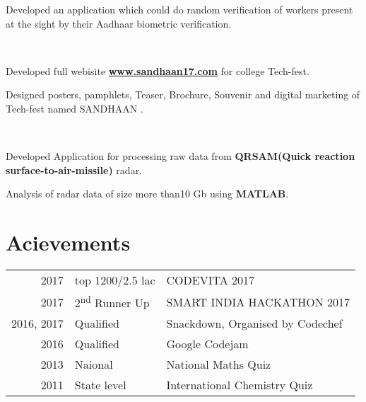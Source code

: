 \documentclass[a4paper]{deedy-resume} %
\begin{document}
\begin{minipage}[t]{0.66\textwidth}
\begin{tightitemize}
\item Developed an application which could do random verification of workers present at the sight by their Aadhaar biometric verification.

\end{tightitemize}
\sectionspace
{}\\

\begin{tightitemize}
\item Developed full webisite \href{http://www.sandhaan17.com} {\bf www.sandhaan17.com}  for college Tech-fest.
\item Designed posters, pamphlets, Teaser, Brochure, Souvenir and digital marketing of Tech-fest named SANDHAAN .
\end{tightitemize}
\sectionspace
 \\

\begin{tightitemize}
\item Developed Application for processing  raw data from \textbf{ QRSAM(Quick reaction surface-to-air-missile)} radar.
\item Analysis of radar data of size more than10 Gb using \textbf{MATLAB}.
\end{tightitemize}


\sectionspace %


\section{Acievements} 

\begin{tabular}{rll}
2017	 & top 1200/2.5 lac & CODEVITA 2017 \\
2017	 & 2\textsuperscript{nd} Runner Up &  SMART INDIA HACKATHON 2017\\
2016, 2017	 & Qualified & Snackdown, Organised by Codechef\\
2016	 & Qualified & Google Codejam\\
2013 & Naional & National Maths Quiz\\
2011 & State level& International Chemistry Quiz\\
\end{tabular}


\end{minipage}
\end{document}
